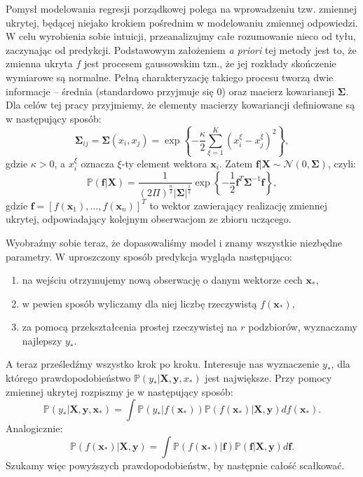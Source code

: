 \documentclass{mini}
\begin{document}
Pomysł modelowania regresji porządkowej polega na wprowadzeniu tzw. zmiennej ukrytej, będącej niejako krokiem pośrednim w modelowaniu zmiennej odpowiedzi. W celu wyrobienia sobie intuicji, przeanalizujmy całe rozumowanie nieco od tyłu, zaczynając od predykcji. Podstawowym założeniem \textit{a priori} tej metody jest to, że zmienna ukryta $f$ jest procesem gaussowskim tzn., że jej rozkłady skończenie wymiarowe są normalne. Pełną charakteryzację takiego procesu tworzą dwie informacje -- średnia (standardowo przyjmuje się $0$) oraz macierz kowariancji $\mathbf{\Sigma}$. Dla celów tej pracy przyjmiemy, że elementy macierzy kowariancji definiowane są w następujący sposób:
$$
\mathbf{\Sigma}_{ij} = \mathbf{\Sigma}(x_i, x_j) = \exp \left\lbrace -\frac{\kappa}{2}\sum_{\xi=1}^K (x_i^{\xi} - x_j^{\xi})^2\right\rbrace,
$$
gdzie $\kappa>0$, a $x_i^{\xi}$ oznacza $\xi$-ty element wektora $\mathbf{x}_i$. Zatem $\mathbf{f} | \mathbf{X} \sim \mathcal{N}(0, \mathbf{\Sigma})$, czyli:
\begin{equation}\label{apriori}
\mathbb{P}(\mathbf{f} | \mathbf{X}) = \frac{1}{(2\Pi)^{\frac{n}{2}}|\mathbf{\Sigma}|^{\frac{1}{2}}}\exp\left\lbrace -\frac{1}{2}\mathbf{f}^T\mathbf{\Sigma}^{-1}\mathbf{f} \right\rbrace,
\end{equation}
gdzie $\mathbf{f} = [f(\mathbf{x}_1), \ldots, f(\mathbf{x}_n)]^T$ to wektor zawierający realizację zmiennej ukrytej, odpowiadający kolejnym obserwacjom ze zbioru uczącego.

Wyobraźmy sobie teraz, że dopasowaliśmy model i znamy wszystkie niezbędne parametry. W uproszczony sposób predykcja wygląda następująco: 
\begin{enumerate}
\item na wejściu otrzymujemy nową obserwację o danym wektorze cech $\textbf{x}_{\ast}$,
\item w pewien sposób wyliczamy dla niej liczbę rzeczywistą $f(\mathbf{x}_{\ast})$,
\item  za pomocą przekształcenia prostej rzeczywistej na $r$ podzbiorów, wyznaczamy najlepszy $y_{\ast}$.
\end{enumerate}

A teraz prześledźmy wszystko krok po kroku. Interesuje nas wyznaczenie $y_{\ast}$, dla którego prawdopodobieństwo $\mathbb{P}(y_{\ast} | \textbf{X}, \textbf{y}, x_{\ast})$ jest największe. Przy pomocy zmiennej ukrytej rozpiszmy je w następujący sposób:
\begin{equation}\label{calka1}
\mathbb{P}(y_{\ast} | \textbf{X}, \textbf{y}, \mathbf{x}_{\ast}) = \int \mathbb{P}(y_{\ast} | f(\mathbf{x}_{\ast}))\mathbb{P}(f(\mathbf{x}_{\ast}) | \textbf{X}, \textbf{y}) df(\mathbf{x}_{\ast}).
\end{equation}
Analogicznie:
\begin{equation}\label{calka2}
\mathbb{P}(f(\mathbf{x}_{\ast}) | \textbf{X}, \textbf{y}) = \int \mathbb{P}(f(\mathbf{x}_{\ast}) | \mathbf{f})\mathbb{P}(\mathbf{f} | \textbf{X}, \textbf{y}) d\mathbf{f}.
\end{equation}
Szukamy więc powyższych prawdopodobieństw, by następnie całość scałkować. 
\end{document}
